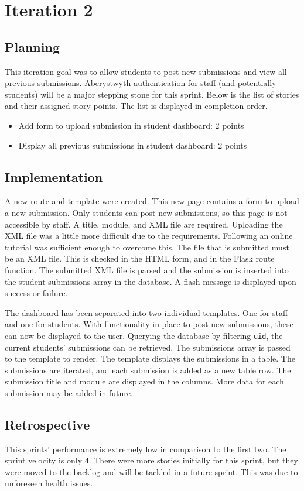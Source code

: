 \chapter{Iteration 2}
\section{Planning}
This iteration goal was to allow students to post new submissions and view all previous submissions. Aberystwyth authentication for staff (and potentially students) will be a major stepping stone for this sprint. Below is the list of stories and their assigned story points. The list is displayed in completion order.

\begin{itemize}
\item Add form to upload submission in student dashboard: 2 points
\item Display all previous submissions in student dashboard: 2 points
\end{itemize}

\section{Implementation}
A new route and template were created. This new page contains a form to upload a new submission. Only students can post new submissions, so this page is not accessible by staff. A title, module, and XML file are required. Uploading the XML file was a little more difficult due to the requirements. Following an online tutorial was sufficient enough to overcome this\cite{FlaskUploadingFiles}. The file that is submitted must be an XML file. This is checked in the HTML form, and in the Flask route function. The submitted XML file is parsed and the submission is inserted into the student submissions array in the database. A flash message is displayed upon success or failure.

The dashboard has been separated into two individual templates. One for staff and one for students. With functionality in place to post new submissions, these can now be displayed to the user. Querying the database by filtering \texttt{uid}, the current students' submissions can be retrieved. The submissions array is passed to the template to render. The template displays the submissions in a table. The submissions are iterated, and each submission is added as a new table row. The submission title and module are displayed in the columns. More data for each submission may be added in future.

\section{Retrospective}
This sprints' performance is extremely low in comparison to the first two. The sprint velocity is only 4. There were more stories initially for this sprint, but they were moved to the backlog and will be tackled in a future sprint. This was due to unforeseen health issues.
